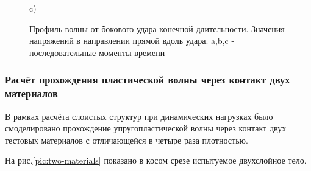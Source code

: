 \begin{figure}
\begin{minipage}{0.3\linewidth}
\end{minipage}
\hfill
\begin{minipage}{0.3\linewidth}
 c)\\
\end{minipage}
\caption{Профиль волны от бокового удара конечной длительности. Значения напряжений в направлении прямой вдоль удара. a,b,c - последовательные моменты времени}
\label{pic:pl-strike-1d}
\end{figure}

\subsubsection{Расчёт прохождения пластической волны через контакт двух материалов}
В рамках расчёта слоистых структур при динамических нагрузках было смоделировано прохождение упругопластической волны через контакт двух тестовых материалов с отличающейся в четыре раза плотностью. 

На рис.\ref{pic:two-materials} показано в косом срезе испытуемое двухслойное тело.

